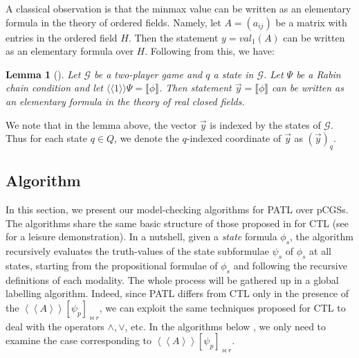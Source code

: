 \documentclass[times, 10 pt,twocolumn]{article}
\newtheorem{lemma}[theorem]{Lemma}{\bfseries}{\itshape}
\newcommand{\mc}[1]{\mathcal{#1}}
\newcommand{\lla}{\langle\langle}
\newcommand{\rra}{\rangle\rangle}
\newcommand{\lb}{\llbracket}
\newcommand{\rb}{\rrbracket}
\begin{document}
A classical observation is that the minmax value can be written as
an elementary formula in the theory of ordered fields. Namely, let
$A=(a_{ij})$ be a matrix with entries in the ordered field $H$.
Then the statement $y=val_1(A)$ can be written as an elementary
formula over $H$. Following from this, we have:
%
%
%
%
\begin{lemma}[\cite{deAM04}] \label{express}
  Let $\mc{G}$ be a two-player game and $q$ a state in $\mc{G}$.
  Let $\Psi$ be a Rabin chain condition and let $\lla 1\rra \Psi =
  \lb\phi\rb$. Then statement $\vec{y}=\lb\phi\rb$ can be written
  as an elementary formula in the theory of real closed fields.
\end{lemma}
We note that in the lemma above, the vector $\vec{y}$ is indexed
by the states of $\mc{G}$. Thus for each state $q\in Q$, we denote
the $q$-indexed coordinate of $\vec{y}$ as $(\vec{y})_q$.

\subsection{Algorithm}
%
%
In this section, we present our model-checking algorithms for PATL
over pCGSs. The algorithms share the same basic structure of those
proposed in \cite{CES86} for CTL (see \cite{CGP00} for a leisure
demonstration). In a nutshell, given a \emph{state} formula
$\phi_s$, the algorithm recursively evaluates the truth-values of
the state subformulae $\psi_s$ of $\phi_s$ at all states, starting
from the propositional formulae of $\phi_s$ and following the
recursive definitions of each modality. The whole process will be
gathered up in a global labelling algorithm. Indeed, since PATL
differs from CTL only in the presence of the $\left\langle
{\left\langle A \right\rangle } \right\rangle[\psi_p]_{\bowtie
r}$, we can exploit the same techniques proposed for CTL to deal
with the operators $\wedge, \vee$, etc. In the algorithms below ,
we only need to examine the case corresponding to $\left\langle
{\left\langle A \right\rangle } \right\rangle[\psi_p]_{\bowtie
r}$.
\end{document}
